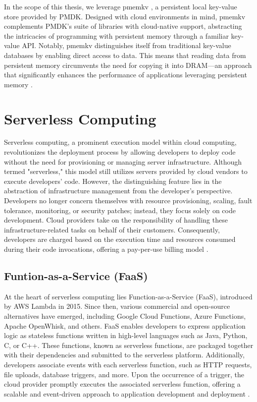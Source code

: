 In the scope of this thesis, we leverage pmemkv \cite{GitHubpm66:online}, a persistent local key-value store provided by PMDK. Designed with cloud environments in mind, pmemkv complements PMDK's suite of libraries with cloud-native support, abstracting the intricacies of programming with persistent memory through a familiar key-value API. Notably, pmemkv distinguishes itself from traditional key-value databases by enabling direct access to data. This means that reading data from persistent memory circumvents the need for copying it into DRAM—an approach that significantly enhances the performance of applications leveraging persistent memory \cite{scargall2020pmem}.

\section{Serverless Computing}
Serverless computing, a prominent execution model within cloud computing, revolutionizes the deployment process by allowing developers to deploy code without the need for provisioning or managing server infrastructure. Although termed "serverless," this model still utilizes servers provided by cloud vendors to execute developers' code. However, the distinguishing feature lies in the abstraction of infrastructure management from the developer's perspective. Developers no longer concern themselves with resource provisioning, scaling, fault tolerance, monitoring, or security patches; instead, they focus solely on code development. Cloud providers take on the responsibility of handling these infrastructure-related tasks on behalf of their customers. Consequently, developers are charged based on the execution time and resources consumed during their code invocations, offering a pay-per-use billing model \cite{jonas2019cloud,romero2021faat,klimovic2018pocket}.

\subsection{Funtion-as-a-Service (FaaS)}
At the heart of serverless computing lies Function-as-a-Service (FaaS), introduced by AWS Lambda in 2015. Since then, various commercial and open-source alternatives have emerged, including Google Cloud Functions, Azure Functions, Apache OpenWhisk, and others. FaaS enables developers to express application logic as stateless functions written in high-level languages such as Java, Python, C, or C++. These functions, known as serverless functions, are packaged together with their dependencies and submitted to the serverless platform. Additionally, developers associate events with each serverless function, such as HTTP requests, file uploads, database triggers, and more. Upon the occurrence of a trigger, the cloud provider promptly executes the associated serverless function, offering a scalable and event-driven approach to application development and deployment \cite{AWSLambd40:online,AzureFun49:online,CloudFun3:online,ApacheOp28:online}.

